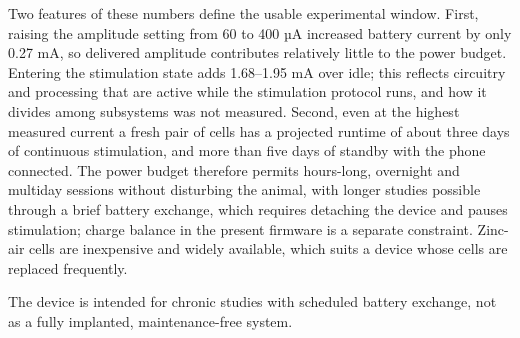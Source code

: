Two features of these numbers define the usable experimental window. First, raising the amplitude setting from 60 to 400 µA increased battery current by only 0.27 mA, so delivered amplitude contributes relatively little to the power budget. Entering the stimulation state adds 1.68--1.95 mA over idle; this reflects circuitry and processing that are active while the stimulation protocol runs, and how it divides among subsystems was not measured. Second, even at the highest measured current a fresh pair of cells has a projected runtime of about three days of continuous stimulation, and more than five days of standby with the phone connected. The power budget therefore permits hours-long, overnight and multiday sessions without disturbing the animal, with longer studies possible through a brief battery exchange, which requires detaching the device and pauses stimulation; charge balance in the present firmware is a separate constraint. Zinc-air cells are inexpensive and widely available, which suits a device whose cells are replaced frequently.

The device is intended for chronic studies with scheduled battery exchange, not as a fully implanted, maintenance-free system.
